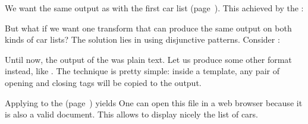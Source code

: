 %
\begin{slide}
 
\raggedslides[0pt]

We want the same output as with the first car list
(page~\hyperlink{hyper:cars1}{\pageref{cars1}}). This achieved by the 
:

\end{slide}


%
\begin{slide}
 
\raggedslides[0pt]

But what if we want one transform that can produce the same output on
both kinds of car lists? The solution lies in using disjunctive
patterns. Consider :

\end{slide}


%
\begin{slide}

\raggedslides[0pt]

Until now, the output of the \XSLT was plain text. Let us produce some
other format instead, like \HTML. The technique is pretty simple:
inside a template, any pair of opening and closing tags will be copied
to the output.  

\end{slide}


%
\begin{slide}

\raggedslides[0pt]

Applying  to the
(page~\hyperlink{hyper:cars1}{\pageref{cars1}}) yields
{\small}
One can open this \XML file in a web browser because it is also a
valid \HTML document. This allows to display nicely the list of cars.

\end{slide}


